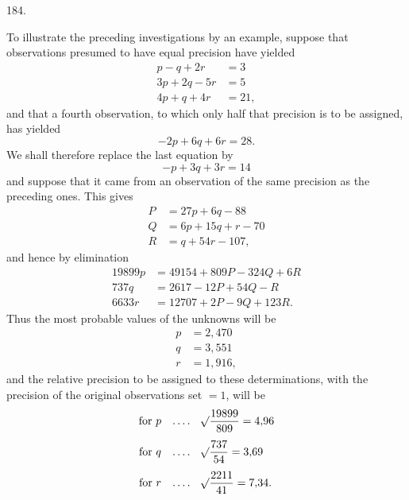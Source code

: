 \begin{center}\hypertarget{native-257-article184}{}184.\end{center}
To illustrate the preceding investigations by an example, suppose that observations presumed to have equal precision have yielded
\[
\begin{aligned}
p-q+2r&=3\\
3p+2q-5r&=5\\
4p+q+4r&=21,
\end{aligned}
\]
and that a fourth observation, to which only half that precision is to be assigned, has yielded
\[
-2p+6q+6r=28.
\]
We shall therefore replace the last equation by
\[
-p+3q+3r=14
\]
and suppose that it came from an observation of the same precision as the preceding ones. This gives
\[
\begin{aligned}
P&=27p+6q-88\\
Q&=6p+15q+r-70\\
R&=q+54r-107,
\end{aligned}
\]
and hence by elimination
\[
\begin{aligned}
19899p&=49154+809P-324Q+6R\\
737q&=2617-12P+54Q-R\\
6633r&=12707+2P-9Q+123R.
\end{aligned}
\]
Thus the most probable values of the unknowns will be
\[
\begin{aligned}
p&=2{,}470\\
q&=3{,}551\\
r&=1{,}916,
\end{aligned}
\]
and the relative precision to be assigned to these determinations, with the precision of the original observations set $=1$, will be
\[
\begin{aligned}
\text{for }p\quad .\,.\,.\,.\quad &\mathord{{}^{}\!\surd}\frac{19899}{809}=4{,}96\\[4pt]
\text{for }q\quad .\,.\,.\,.\quad &\mathord{{}^{}\!\surd}\frac{737}{54}=3{,}69\\[4pt]
\text{for }r\quad .\,.\,.\,.\quad &\mathord{{}^{}\!\surd}\frac{2211}{41}=7{,}34.
\end{aligned}
\]
